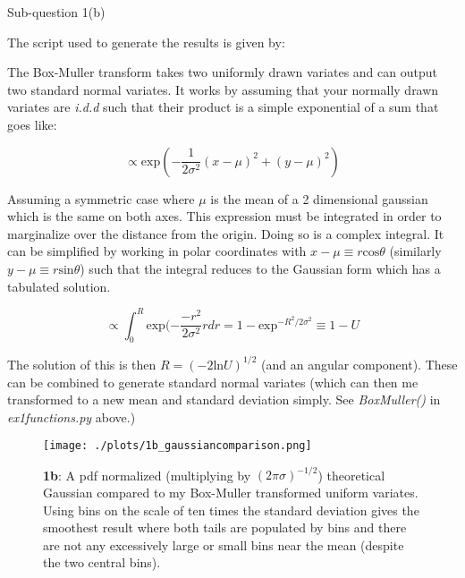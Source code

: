 \begin{subsection}{Sub-question 1(b)}

The script used to generate the results is given by:
  


The Box-Muller transform takes two uniformly drawn variates and can output two standard normal variates. It works by assuming that your normally drawn variates are \textit{i.d.d} such that their product is a simple exponential of a sum that goes like:

\begin{equation}
  \propto \text{exp}(-\frac{1}{2\sigma^2}(x-\mu)^2+(y-\mu)^2)
\end{equation}

Assuming a symmetric case where $\mu$ is the mean of a 2 dimensional gaussian which is the same on both axes. This expression must be integrated in order to marginalize over the distance from the origin. Doing so is a complex integral. It can be simplified by working in polar coordinates with $x-\mu \equiv r\text{cos}\theta$ (similarly $y-\mu \equiv r\text{sin}\theta$) such that the integral reduces to the Gaussian form which has a tabulated solution.

\begin{equation}
  \propto \int_0^R\text{exp}(-\frac{-r^2}{2\sigma^2}rdr = 1-\text{exp}^{-R^2/2\sigma^2} \equiv 1 - \textit{U}
\end{equation}

The solution of this is then $R=(-2\text{ln}\textit{U})^{1/2}$ (and an angular component). These can be combined to generate standard normal variates (which can then me transformed to a new mean and standard deviation simply. See \textit{BoxMuller()} in \textit{ex1functions.py} above.)

\begin{figure}[h!]
  \centering
  \texttt{[image: ./plots/1b\_gaussiancomparison.png]}
  \caption{\textbf{1b}: A pdf normalized (multiplying by $(2\pi\sigma)^{-1/2}$) theoretical Gaussian compared to my Box-Muller transformed uniform variates. Using bins on the scale of ten times the standard deviation gives the smoothest result where both tails are populated by bins and there are not any excessively large or small bins near the mean (despite the two central bins).}
  \label{fig:gaussiancomparison}
\end{figure}



\end{subsection}

